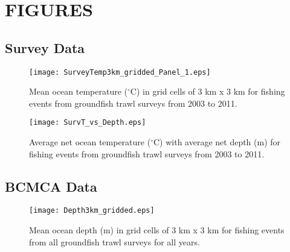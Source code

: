 \documentclass[11pt]{book}\usepackage[]{graphicx}\usepackage[]{color}
\begin{document}
\newpage


\section{FIGURES}
\subsection{Survey Data}


\graphicspath{ {c:/GitHub/SPERA-Maps/Results/Figures/} }
\begin{figure}[!htp]
\begin{center}
\texttt{[image: SurveyTemp3km\_gridded\_Panel\_1.eps]}
\end{center}
\caption{Mean ocean temperature ($^\circ$C) in grid cells of 3 km x 3 km for fishing events from groundfish trawl surveys from 2003 to 2011.}
\label{fig:survtemppanel}
\end{figure}

\newpage


\newpage
\graphicspath{ {c:/GitHub/SPERA-Maps/Results/Figures/} }
\begin{figure}[!htp]
\begin{center}
\texttt{[image: SurvT\_vs\_Depth.eps]}
\end{center}
\caption{Average net ocean temperature ($^\circ$C) with average net depth (m) for fishing events from groundfish trawl surveys from 2003 to 2011.}
\label{fig:survtemppanel}
\end{figure}

\newpage

\subsection{BCMCA Data}


\graphicspath{ {c:/GitHub/SPERA-Maps/Results/Figures/} }
\begin{figure}[!htp]
\begin{center}
\texttt{[image: Depth3km\_gridded.eps]}
\end{center}
\caption{Mean ocean depth (m) in grid cells of 3 km x 3 km for fishing events from all groundfish trawl surveys for all years.}
\label{fig:allsurveysdepth}
\end{figure}
\end{document}
